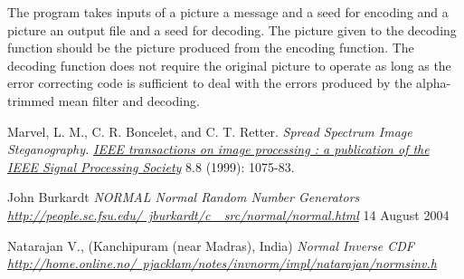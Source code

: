 \documentclass[11pt]{article}
\begin{document}
\indent
The program takes inputs of a picture a message and a seed for encoding and a picture an output file and a seed for decoding. The picture given to the
decoding function should be the picture produced from the encoding function. The decoding function does not require the original picture to operate as
long as the error correcting code is sufficient to deal with the errors produced by the alpha-trimmed mean filter and decoding.

\newpage
\begin{thebibliography}{9}

Marvel, L. M., C. R. Boncelet, and C. T. Retter. 
\textit{Spread Spectrum Image Steganography.}
\textit{\underline{IEEE transactions on image processing : a publication of the IEEE Signal Processing Society}}
8.8 (1999): 1075-83.

John Burkardt
\textit{NORMAL Normal Random Number Generators }
\textit{\underline{http://people.sc.fsu.edu/~jburkardt/c\_ src/normal/normal.html}}
14 August 2004

Natarajan V., (Kanchipuram (near Madras), India)
\textit{Normal Inverse CDF}
\textit{\underline{http://home.online.no/~pjacklam/notes/invnorm/impl/natarajan/normsinv.h}}
\end{thebibliography}
\end{document}
